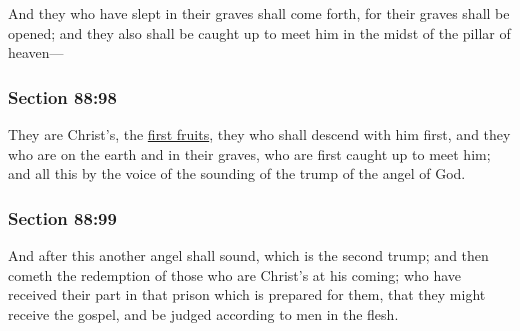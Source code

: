 		And they who have slept in their graves shall come forth, for their graves shall be opened; and they also shall be caught up to meet him in the midst of the pillar of heaven---


	\subsubsection{Section 88:98} %
		\label{DC88-98}

		They are Christ's, the \hyperref[FIRSTFRUITS]{first fruits}, they who shall descend with him first, and they who are on the earth and in their graves, who are first caught up to meet him; and all this by the voice of the sounding of the trump of the angel of God.


	\subsubsection{Section 88:99} %
		\label{DC88-99}

		And after this another angel shall sound, which is the second trump; and then cometh the redemption of those who are Christ's at his coming; who have received their part in that prison which is prepared for them, that they might receive the gospel, and be judged according to men in the flesh.


